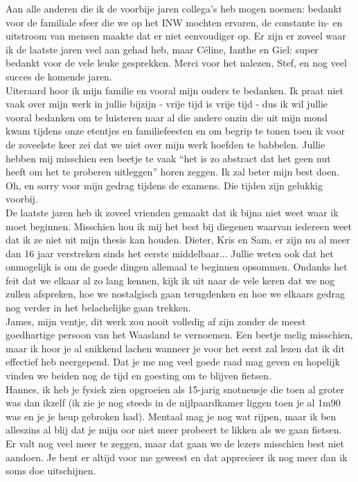 \noindent Aan alle anderen die ik de voorbije jaren collega's heb mogen noemen: bedankt voor de familiale sfeer die we op het INW mochten ervaren, de constante in- en uitstroom van mensen maakte dat er niet eenvoudiger op. Er zijn er zoveel waar ik de laatste jaren veel aan gehad heb, maar C\'eline, Ianthe en Giel: super bedankt voor de vele leuke gesprekken. Merci voor het nalezen, Stef, en nog veel succes de komende jaren.\\

\noindent Uiteraard hoor ik mijn familie en vooral mijn ouders te bedanken. Ik praat niet vaak over mijn werk in jullie bijzijn - vrije tijd is vrije tijd - dus ik wil jullie vooral bedanken om te luisteren naar al die andere onzin die uit mijn mond kwam tijdens onze etentjes en familiefeesten en om begrip te tonen toen ik voor de zoveelste keer zei dat we niet over mijn werk hoefden te babbelen. Jullie hebben mij misschien een beetje te vaak ``het is zo abstract dat het geen nut heeft om het te proberen uitleggen'' horen zeggen. Ik zal beter mijn best doen. Oh, en sorry voor mijn gedrag tijdens de examens. Die tijden zijn gelukkig voorbij.\\

\noindent De laatste jaren heb ik zoveel vrienden gemaakt dat ik bijna niet weet waar ik moet beginnen. Misschien hou ik mij het best bij diegenen waarvan iedereen weet dat ik ze niet uit mijn thesis kan houden. Dieter, Kris en Sam, er zijn nu al meer dan 16 jaar verstreken sinds het eerste middelbaar... Jullie weten ook dat het onmogelijk is om de goede dingen allemaal te beginnen opsommen. Ondanks het feit dat we elkaar al zo lang kennen, kijk ik uit naar de vele keren dat we nog zullen afspreken, hoe we nostalgisch gaan terugdenken en hoe we elkaars gedrag nog verder in het belachelijke gaan trekken.\\

\noindent James, mijn ventje, dit werk zou nooit volledig af zijn zonder de meest goedhartige persoon van het Waasland te vernoemen. Een beetje melig misschien, maar ik hoor je al snikkend lachen wanneer je voor het eerst zal lezen dat ik dit effectief heb neergepend. Dat je me nog veel goede raad mag geven en hopelijk vinden we beiden nog de tijd en goesting om te blijven fietsen.\\

\noindent Hannes, ik heb je fysiek zien opgroeien als 15-jarig snotneusje die toen al groter was dan ikzelf (ik zie je nog steeds in de nijlpaardkamer liggen toen je al 1m90 was en je je heup gebroken had). Mentaal mag je nog wat rijpen, maar ik ben alleszins al blij dat je mijn oor niet meer probeert te likken als we gaan fietsen. Er valt nog veel meer te zeggen, maar dat gaan we de lezers misschien best niet aandoen. Je bent er altijd voor me geweest en dat apprecieer ik nog meer dan ik soms doe uitschijnen.\\

